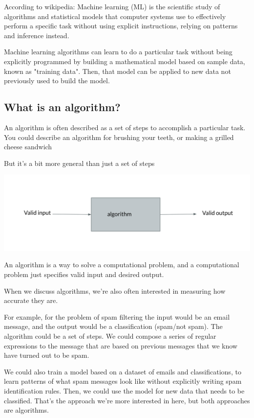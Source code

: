 \documentclass[12pt]{article}
\begin{document}
According to wikipedia:
Machine learning (ML) is the scientific study of algorithms and statistical models that computer systems use to effectively perform a specific task without using explicit instructions, relying on patterns and inference instead.


Machine learning algorithms can learn to do a particular task without being explicitly programmed by building a mathematical model based on sample data, known as "training data". Then, that model can be applied to new data not previously used to build the model.

\subsection{What is an algorithm?}

An algorithm is often described as a set of steps to accomplish a particular task. You could describe an algorithm for brushing your teeth, or making a grilled cheese sandwich 

But it's a bit more general than just a set of steps 

\includegraphics[width={\textwidth}]{algo-abstract}


An algorithm is a way to solve a computational problem, and a computational problem just specifies valid input and desired output. 

When we discuss algorithms, we're also often interested in measuring how accurate they are.

For example, for the problem of spam filtering the input would be an email message, and the output would be a classification (spam/not spam). The algorithm could be a set of steps. We could compose a series of regular expressions to the message that are based on previous messages that we know have turned out to be spam.

We could also train a model based on a dataset of emails and classifications, to learn patterns of what spam messages look like without explicitly writing spam identification rules. Then, we could use the model for new data that needs to be classified. That's the approach we're more interested in here, but both approaches are algorithms.
\end{document}
